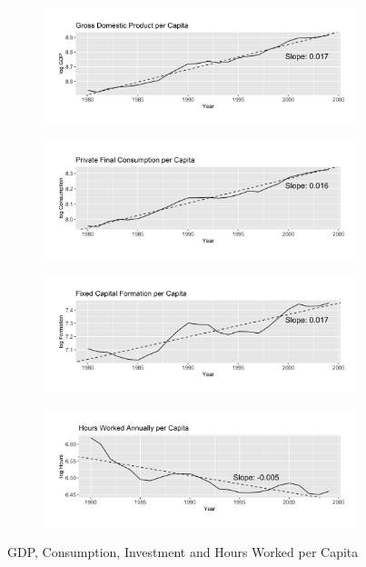 \documentclass[12pt]{article}
\begin{document}
\begin{figure}
    \centering
    \begin{subfigure}[b]{1\textwidth}
        \includegraphics[width=\textwidth]{OUTPUT/MEDIA/loggdp_pc.png}
    \end{subfigure}
    \vspace{-20pt}
    \begin{subfigure}[b]{1\textwidth}
        \includegraphics[width=\textwidth]{OUTPUT/MEDIA/logcons_pc.png}
    \end{subfigure}
    \vspace{-20pt}
    \begin{subfigure}[b]{1\textwidth}
        \includegraphics[width=\textwidth]{OUTPUT/MEDIA/loginv_pc.png}
    \end{subfigure}
    \vspace{-20pt}
    \begin{subfigure}[b]{1\textwidth}
        \includegraphics[width=\textwidth]{OUTPUT/MEDIA/loghours_pc.png}
    \end{subfigure}
    \caption{GDP, Consumption, Investment and Hours Worked per Capita}
    \label{fig:descriptive}
\end{figure}
\clearpage %
\end{document}
